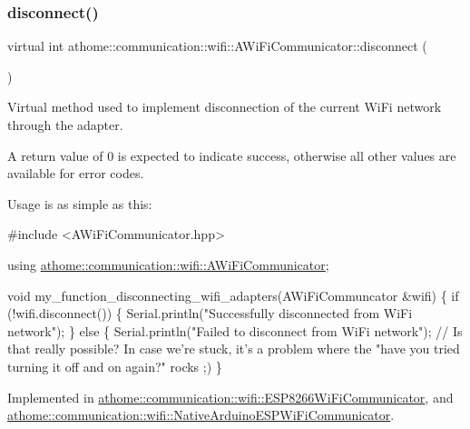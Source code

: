 \mbox{\label{classathome_1_1communication_1_1wifi_1_1_a_wi_fi_communicator_a6131240ac0daa0f9fb4d46871feea4c2}} 
\subsubsection{\texorpdfstring{disconnect()}{disconnect()}}
{\footnotesize\ttfamily virtual int athome\+::communication\+::wifi\+::\+A\+Wi\+Fi\+Communicator\+::disconnect (\begin{DoxyParamCaption}{ }\end{DoxyParamCaption})\hspace{0.3cm}{\ttfamily [pure virtual]}}

Virtual method used to implement disconnection of the current Wi\+Fi network through the adapter.

A return value of 0 is expected to indicate success, otherwise all other values are available for error codes.

Usage is as simple as this\+:


\begin{DoxyCode}
\textcolor{preprocessor}{#include <AWiFiCommunicator.hpp>}

\textcolor{keyword}{using} \mbox{\hyperlink{classathome_1_1communication_1_1wifi_1_1_a_wi_fi_communicator}{athome::communication::wifi::AWiFiCommunicator}};

\textcolor{keywordtype}{void} my\_function\_disconnecting\_wifi\_adapters(AWiFiCommuncator &wifi) \{
  \textcolor{keywordflow}{if} (!wifi.disconnect()) \{
    Serial.println(\textcolor{stringliteral}{"Successfully disconnected from WiFi network"});
  \} \textcolor{keywordflow}{else} \{
    Serial.println(\textcolor{stringliteral}{"Failed to disconnect from WiFi network"}); \textcolor{comment}{// Is that really possible? In case we're
       stuck, it's a problem where the "have you tried turning it off and on again?" rocks ;)}
\}
\end{DoxyCode}
 

Implemented in \mbox{\hyperlink{classathome_1_1communication_1_1wifi_1_1_e_s_p8266_wi_fi_communicator_a7e53e10b858aebc5e7c6c0ea6007f84a}{athome\+::communication\+::wifi\+::\+E\+S\+P8266\+Wi\+Fi\+Communicator}}, and \mbox{\hyperlink{classathome_1_1communication_1_1wifi_1_1_native_arduino_e_s_p_wi_fi_communicator_a3787e850d48d149ee1392ebfb2920bb3}{athome\+::communication\+::wifi\+::\+Native\+Arduino\+E\+S\+P\+Wi\+Fi\+Communicator}}.

